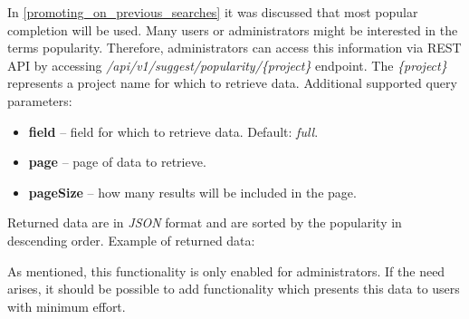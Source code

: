 In \ref{promoting_on_previous_searches} it was discussed that most popular completion will be used. Many users or
administrators might be interested in the terms popularity. Therefore, administrators can access this information
via REST API by accessing \textit{/api/v1/suggest/popularity/\{project\}} endpoint. The \textit{\{project\}} represents
a project name for which to retrieve data. Additional supported query parameters:
\begin{itemize}
    \item \textbf{field} – field for which to retrieve data. Default: \textit{full}.
    \item \textbf{page} – page of data to retrieve.
    \item \textbf{pageSize} – how many results will be included in the page.
\end{itemize}

Returned data are in \textit{JSON} format and are sorted by the popularity in descending order. Example of returned data:
\begin{code}
\end{code}

As mentioned, this functionality is only enabled for administrators. If the need arises, it should be possible to add
functionality which presents this data to users with minimum effort.
